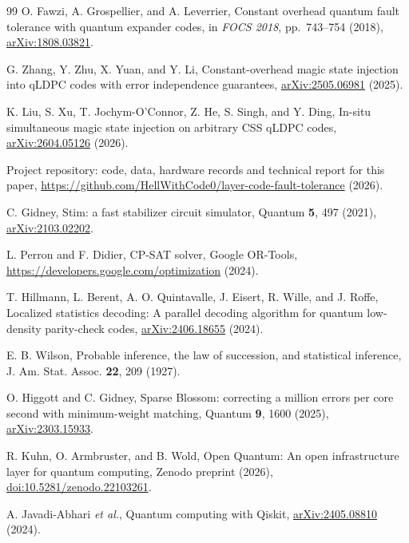 \begin{thebibliography}{99}
O. Fawzi, A. Grospellier, and A. Leverrier, Constant overhead quantum fault tolerance with quantum expander codes, in \emph{FOCS 2018}, pp.\ 743--754 (2018), \href{https://arxiv.org/abs/1808.03821}{arXiv:1808.03821}.

G. Zhang, Y. Zhu, X. Yuan, and Y. Li, Constant-overhead magic state injection into qLDPC codes with error independence guarantees, \href{https://arxiv.org/abs/2505.06981}{arXiv:2505.06981} (2025).

K. Liu, S. Xu, T. Jochym-O'Connor, Z. He, S. Singh, and Y. Ding, In-situ simultaneous magic state injection on arbitrary CSS qLDPC codes, \href{https://arxiv.org/abs/2604.05126}{arXiv:2604.05126} (2026).

Project repository: code, data, hardware records and technical report for this paper, \url{https://github.com/HellWithCode0/layer-code-fault-tolerance} (2026).

C. Gidney, Stim: a fast stabilizer circuit simulator, Quantum \textbf{5}, 497 (2021), \href{https://arxiv.org/abs/2103.02202}{arXiv:2103.02202}.

L. Perron and F. Didier, CP-SAT solver, Google OR-Tools, \url{https://developers.google.com/optimization} (2024).

T. Hillmann, L. Berent, A. O. Quintavalle, J. Eisert, R. Wille, and J. Roffe, Localized statistics decoding: A parallel decoding algorithm for quantum low-density parity-check codes, \href{https://arxiv.org/abs/2406.18655}{arXiv:2406.18655} (2024).

E. B. Wilson, Probable inference, the law of succession, and statistical inference, J. Am. Stat. Assoc. \textbf{22}, 209 (1927).

O. Higgott and C. Gidney, Sparse Blossom: correcting a million errors per core second with minimum-weight matching, Quantum \textbf{9}, 1600 (2025), \href{https://arxiv.org/abs/2303.15933}{arXiv:2303.15933}.

R. Kuhn, O. Armbruster, and B. Wold, Open Quantum: An open infrastructure layer for quantum computing, Zenodo preprint (2026), \href{https://doi.org/10.5281/zenodo.22103261}{doi:10.5281/zenodo.22103261}.

A. Javadi-Abhari \emph{et al.}, Quantum computing with Qiskit, \href{https://arxiv.org/abs/2405.08810}{arXiv:2405.08810} (2024).


\end{thebibliography}

